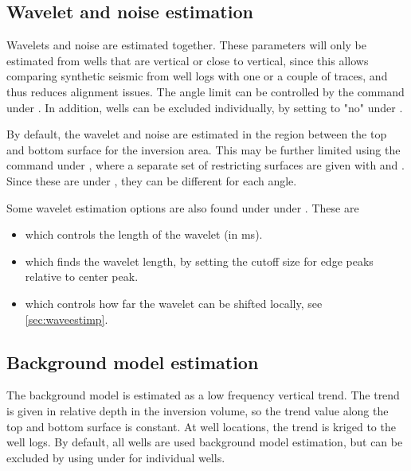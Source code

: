 {\subsection{Wavelet and noise estimation}
Wavelets and noise are estimated together. These parameters will only
be estimated from wells that are vertical or close to vertical, since
this allows comparing synthetic seismic from well logs with one or a
couple of traces, and thus reduces alignment issues. The angle limit
can be controlled by the
 command
under . In addition, wells can be excluded individually,
by setting  to "no" under . 

By default, the wavelet and noise are estimated in the region between
the top and bottom surface for the inversion area. This may be further
limited using the  command under
, where a separate set of restricting surfaces are given
with  and . Since these are
under , they can be different for each angle. 

Some wavelet estimation options are also found under  under . These are
\begin{itemize}
\item {} which controls the length of the wavelet (in ms).
\item {} which finds the wavelet
  length, by setting the cutoff size for edge peaks relative to center
  peak. 
\item {} which controls how far the wavelet
  can be shifted locally, see \autoref{sec:waveestimp}. 
\end{itemize}

\subsection{Background model estimation}
The background model is estimated as a low frequency vertical
trend. The trend is given in relative depth in the inversion volume,
so the trend value along the top and bottom surface is constant. At
well locations, the trend is kriged to the well logs. By default, all
wells are used background model estimation, but can be excluded by
using  under  for individual
wells. 

}
